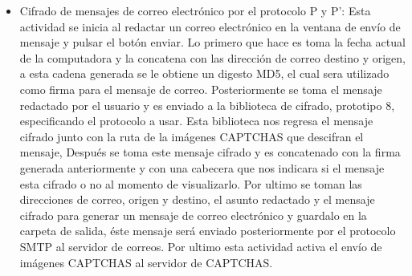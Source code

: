 \documentclass[12pt,oneside,onecolumn,openany]{report}
\begin{document}
\begin{itemize}
 \item Cifrado de mensajes de correo electrónico por el protocolo P y P’: Esta actividad se inicia al redactar un correo electrónico en la ventana de envío de mensaje y pulsar el botón enviar. 
Lo primero que hace es toma la fecha actual de la computadora y la concatena con las dirección de correo destino y origen, a esta cadena generada  se le  obtiene un digesto MD5, el cual sera utilizado como firma para el mensaje de correo. Posteriormente se toma el mensaje redactado por el usuario y es enviado a la biblioteca de cifrado, prototipo 8, especificando el protocolo a usar. Esta biblioteca nos regresa el mensaje cifrado junto con la ruta de la imágenes CAPTCHAS que descifran el mensaje, Después se toma este mensaje cifrado y es concatenado con la firma generada anteriormente  y con una cabecera que nos indicara si el mensaje esta cifrado o no al momento de visualizarlo. Por ultimo se toman las direcciones de correo, origen y destino, el asunto redactado y el mensaje cifrado para generar un mensaje de correo electrónico y guardalo en la carpeta de salida, éste mensaje será enviado posteriormente por el protocolo SMTP al servidor de correos. Por ultimo esta actividad activa el envío de imágenes CAPTCHAS al servidor de CAPTCHAS.
 

\end{itemize}
\end{document}
